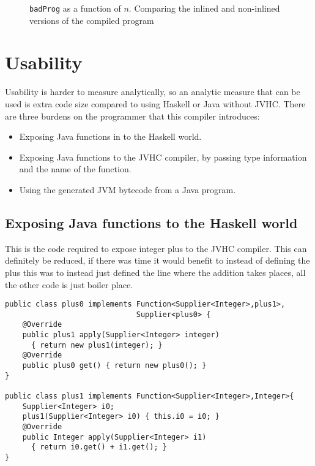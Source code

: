 \documentclass[float=false, crop=false]{standalone}
\newlength\gwidth
\newlength\gheight
\newcommand{\importMGraph}[3]{\setlength{\gwidth}{#2}\setlength{\gheight}{#3}{#1}}
\begin{document}
\begin{figure}
  \centering
  \importMGraph{plotBadInline}{0.96\textwidth}{0.3\textwidth}
  \caption{\texttt{badProg} as a function of $n$. Comparing the inlined and non-inlined
  versions of the compiled program}
    \label{plot:badInline}
\end{figure}

\section{Usability}

Usability is harder to measure analytically, so an analytic measure that can be used is extra code size
compared to using Haskell or Java without JVHC.
There are three burdens on the programmer that this compiler introduces:
\begin{itemize}
  \item Exposing Java functions in to the Haskell world.
  \item Exposing Java functions to the JVHC compiler, by passing type information and the name 
    of the function.

  \item Using the generated JVM bytecode from a Java program.
\end{itemize}

\subsection{Exposing Java functions to the Haskell world}

This is the code required to expose integer plus to the JVHC compiler. 
This can definitely be reduced, if there was time it would benefit to instead of defining the plus
this was to instead just defined the line where the addition takes places, all
the other code is just boiler place.

\begin{verbatim}
public class plus0 implements Function<Supplier<Integer>,plus1>, 
                              Supplier<plus0> {
    @Override
    public plus1 apply(Supplier<Integer> integer) 
      { return new plus1(integer); }
    @Override
    public plus0 get() { return new plus0(); }
}

public class plus1 implements Function<Supplier<Integer>,Integer>{
    Supplier<Integer> i0;
    plus1(Supplier<Integer> i0) { this.i0 = i0; }
    @Override
    public Integer apply(Supplier<Integer> i1) 
      { return i0.get() + i1.get(); }
}
\end{verbatim}
\end{document}
